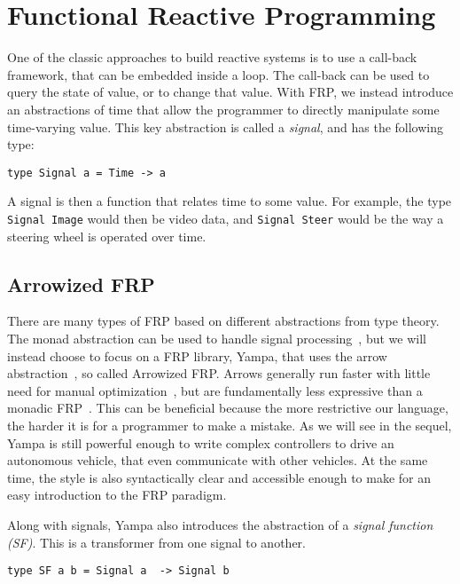 \section{Functional Reactive Programming}

One of the classic approaches to build reactive systems is to use a call-back framework, that can be embedded inside a loop.
The call-back can be used to query the state of value, or to change that value.
With FRP, we instead introduce an abstractions of time that allow the programmer to directly manipulate some time-varying value.
This key abstraction is called a \textit{signal}, and has the following type:

\begin{lstlisting}
type Signal a = Time -> a
\end{lstlisting}

A signal is then a function that relates time to some value.
For example, the type \texttt{Signal Image} would then be video data, and \texttt{Signal Steer} would be the way a steering wheel is operated over time.

\subsection{Arrowized FRP}

There are many types of FRP based on different abstractions from type theory.
The monad abstraction can be used to handle signal processing~\cite{van2014monadic},
  but we will instead choose to focus on a FRP library, Yampa, that uses the arrow abstraction~\cite{hudak2003arrows}, so called Arrowized FRP.
Arrows generally run faster with little need for manual optimization~\cite{yallop2016causal}, but are fundamentally less expressive than a monadic FRP~\cite{lindley2011idioms}.
This can be beneficial because the more restrictive our language, the harder it is for a programmer to make a mistake.
As we will see in the sequel, Yampa is still powerful enough to write complex controllers to drive an autonomous vehicle, that even communicate with other vehicles.
At the same time, the style is also syntactically clear and accessible enough to make for an easy introduction to the FRP paradigm.

Along with signals, Yampa also introduces the abstraction of a \textit{signal function (SF)}.
This is a transformer from one signal to another.

\begin{lstlisting}
type SF a b = Signal a  -> Signal b
\end{lstlisting}

